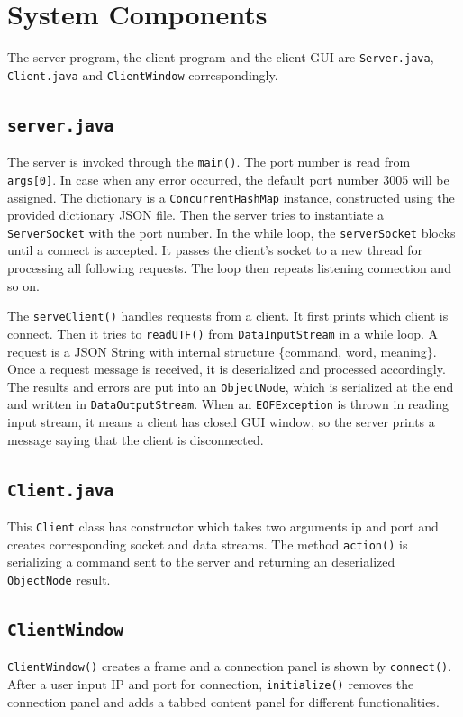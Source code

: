 \documentclass[12pt]{article}
\begin{document}
\newpage
\section{System Components}
The server program, the client program and the client GUI are \texttt{Server.java}, \texttt{Client.java} and \texttt{ClientWindow} correspondingly.

\subsection{\texttt{server.java}}
The server is invoked through the \texttt{main()}. The port number is read from \texttt{args[0]}. In case when any error occurred, the default port number 3005 will be assigned. The dictionary is a \texttt{ConcurrentHashMap} instance, constructed using the provided dictionary JSON file. Then the server tries to instantiate a \texttt{ServerSocket} with the port number. In the while loop, the \texttt{serverSocket} blocks until a connect is accepted. It passes the client's socket to a new thread for processing all following requests. The loop then repeats listening connection and so on. 

The \texttt{serveClient()} handles requests from a client. It first prints which client is connect. Then it tries to \texttt{readUTF()} from \texttt{DataInputStream} in a while loop. A request is a JSON String with internal structure \{command, word, meaning\}. Once a request message is received, it is deserialized and processed accordingly. The results and errors are put into an \texttt{ObjectNode}, which is serialized at the end and written in \texttt{DataOutputStream}. When an \texttt{EOFException} is thrown in reading input stream, it means a client has closed GUI window, so the server prints a message saying that the client is disconnected.

\subsection{\texttt{Client.java}}
This \texttt{Client} class has constructor which takes two arguments ip and port and creates corresponding socket and data streams. The method \texttt{action()} is serializing a command sent to the server and returning an deserialized \texttt{ObjectNode} result.

\subsection{\texttt{ClientWindow}}
\texttt{ClientWindow()} creates a frame and a connection panel is shown by \texttt{connect()}. After a user input IP and port for connection, \texttt{initialize()} removes the connection panel and adds a tabbed content panel for different functionalities.
\end{document}
